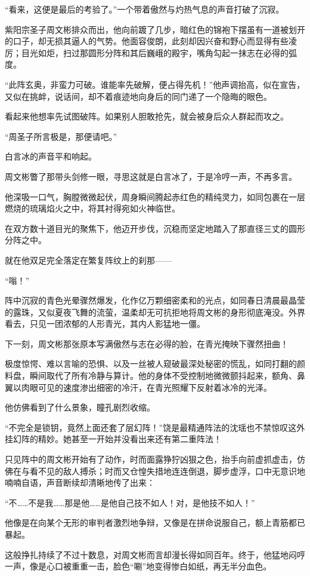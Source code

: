 “看来，这便是最后的考验了。”一个带着傲然与灼热气息的声音打破了沉寂。

紫阳宗圣子周文彬排众而出，他向前踱了几步，暗红色的锦袍下摆虽有一道被划开的口子，却无损其逼人的气势。他面容俊朗，此刻却因兴奋和野心而显得有些凌厉；目光如炬，扫过那圆形分阵和其后巍峨的殿宇，嘴角勾起一抹志在必得的弧度。

“此阵玄奥，非蛮力可破。谁能率先破解，便占得先机！”他声调抬高，似在宣告，又似在挑衅，说话间，却不着痕迹地向身后的同门递了一个隐晦的眼色。

看起来他想率先试图破阵。如果别人胆敢抢先，就会被身后众人群起而攻之。

“周圣子所言极是，那便请吧。”

白言冰的声音平和响起。

周文彬瞥了那带头剑修一眼，寻思这就是白言冰了，于是冷哼一声，不再多言。

他深吸一口气，胸膛微微起伏，周身瞬间腾起赤红色的精纯灵力，如同包裹在一层燃烧的琉璃焰火之中，将其衬得宛如火神临世。

在双方数十道目光的聚焦下，他迈开步伐，沉稳而坚定地踏入了那直径三丈的圆形分阵之中。

就在他双足完全落定在繁复阵纹上的刹那——

“嗡！”

阵中沉寂的青色光晕骤然爆发，化作亿万颗细密柔和的光点，如同春日清晨最晶莹的露珠，又似夏夜飞舞的流萤，温柔却无可抗拒地将周文彬的身形彻底淹没。外界看去，只见一团浓郁的人形青光，其内人影猛地一僵。

下一刻，周文彬那张原本写满傲然与志在必得的脸，在青光掩映下骤然扭曲！

极度惊愕、难以言喻的恐惧、以及一丝被人窥破最深处秘密的慌乱，如同打翻的颜料盘，瞬间取代了所有冷静与算计。他的身体不受控制地微微颤抖起来，额角、鼻翼以肉眼可见的速度渗出细密的冷汗，在青光照耀下反射着冰冷的光泽。

他仿佛看到了什么景象，瞳孔剧烈收缩。

“不完全是锁钥，竟然上面还套了层幻阵！”饶是最精通阵法的沈瑶也不禁惊叹这外挂幻阵的精妙。她甚至一开始并没看出来还有第二重阵法！

只见阵中的周文彬开始有了动作，时而面露狰狞凶狠之色，抬手向前虚抓虚击，仿佛在与看不见的敌人搏杀；时而又仓惶失措地连连倒退，脚步虚浮，口中无意识地喃喃自语，声音断续却清晰地传了出来：

“不……不是我……那是他……是他自己技不如人！对，是他技不如人！”

他像是在向某个无形的审判者激烈地争辩，又像是在拼命说服自己，额上青筋都已暴起。

这般挣扎持续了不过十数息，对周文彬而言却漫长得如同百年。终于，他猛地闷哼一声，像是心口被重重一击，脸色“唰”地变得惨白如纸，再无半分血色。

